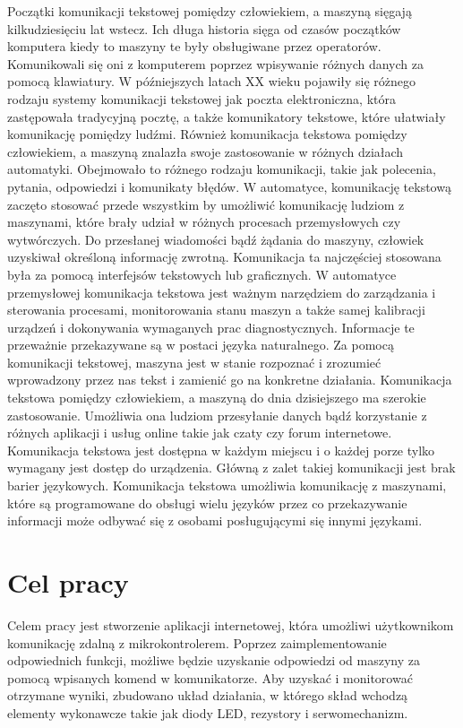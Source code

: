 
Początki komunikacji tekstowej pomiędzy człowiekiem, a maszyną sięgają kilkudziesięciu lat wstecz. Ich długa historia sięga od czasów początków komputera kiedy to maszyny te były obsługiwane przez operatorów. Komunikowali się oni z komputerem poprzez wpisywanie różnych danych za pomocą klawiatury. W późniejszych latach XX wieku pojawiły się różnego rodzaju systemy komunikacji tekstowej jak poczta elektroniczna, która zastępowała tradycyjną pocztę, a także komunikatory tekstowe, które ułatwiały komunikację pomiędzy ludźmi. Również komunikacja tekstowa pomiędzy człowiekiem, a maszyną znalazła swoje zastosowanie w różnych działach automatyki. Obejmowało to różnego rodzaju komunikacji, takie jak polecenia, pytania, odpowiedzi i komunikaty błędów. W automatyce, komunikację tekstową zaczęto stosować przede wszystkim by umożliwić komunikację ludziom z maszynami, które brały udział w różnych procesach przemysłowych czy wytwórczych. Do przesłanej wiadomości bądź żądania do maszyny, człowiek uzyskiwał określoną informację zwrotną. Komunikacja ta najczęściej stosowana była za pomocą interfejsów tekstowych lub graficznych. W automatyce przemysłowej komunikacja tekstowa jest ważnym narzędziem do zarządzania i sterowania procesami, monitorowania stanu maszyn a także samej kalibracji urządzeń i dokonywania wymaganych prac diagnostycznych. Informacje te przeważnie przekazywane są w postaci języka naturalnego. Za pomocą komunikacji tekstowej, maszyna jest w stanie rozpoznać i zrozumieć wprowadzony przez nas tekst i zamienić go na konkretne działania. Komunikacja tekstowa pomiędzy człowiekiem, a maszyną do dnia dzisiejszego ma szerokie zastosowanie. Umożliwia ona ludziom przesyłanie danych bądź korzystanie z różnych aplikacji i usług online takie jak czaty czy forum internetowe. Komunikacja tekstowa jest dostępna w każdym miejscu i o każdej porze tylko wymagany jest dostęp do urządzenia. Główną z zalet takiej komunikacji jest brak barier językowych. Komunikacja tekstowa umożliwia komunikację z maszynami, które są programowane do obsługi wielu języków przez co przekazywanie informacji może odbywać się z osobami posługującymi się innymi językami.
\newpage
\section{Cel pracy}
Celem pracy jest stworzenie aplikacji internetowej, która umożliwi użytkownikom komunikację zdalną z mikrokontrolerem. Poprzez zaimplementowanie odpowiednich funkcji, możliwe będzie uzyskanie odpowiedzi od maszyny za pomocą wpisanych komend w komunikatorze. Aby uzyskać i monitorować otrzymane wyniki, zbudowano układ działania, w którego skład wchodzą elementy wykonawcze takie jak diody LED, rezystory i serwomechanizm.

